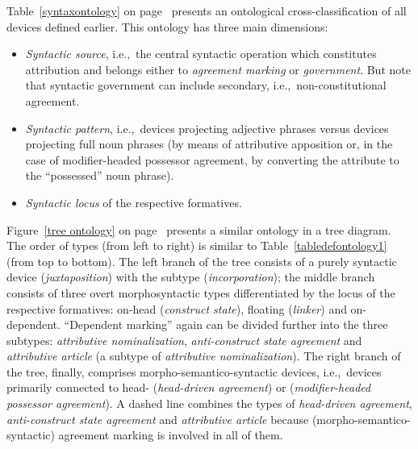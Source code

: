 Table~\ref{syntaxontology} on page~\pageref{syntaxontology} presents an ontological cross-classification of all devices defined earlier. This ontology has three main dimensions: 
\begin{itemize}
\item\textit{Syntactic source}, i.e.,~the central syntactic operation which constitutes attribution and belongs either to \textit{agreement marking} or \textit{government}. But note that syntactic government can include secondary, i.e.,~non-constitutional agreement.
\item\textit{Syntactic pattern}, i.e.,~devices projecting adjective phrases versus devices projecting full noun phrases (by means of attributive apposition or, in the case of modifier\hyp{}headed possessor agreement, by converting the attribute to the “possessed” noun phrase).
\item\textit{Syntactic locus} of the respective formatives.
\end{itemize}
Figure~\ref{tree ontology} on page~\pageref{tree ontology} presents a similar ontology in a tree diagram. The order of types (from left to right) is similar to Table~\ref{tabledefontology1} (from top to bottom). The left branch of the tree consists of a purely syntactic device (\textit{juxtaposition}) with the subtype (\textit{incorporation}); the middle branch consists of three overt morphosyntactic types differentiated by the locus of the respective formatives: on-head (\textit{construct state}), floating (\textit{linker}) and on-dependent. “Dependent marking” again can be divided further into the three subtypes: \textit{attributive nominalization}, \textit{anti\hyp{}construct state agreement} and \textit{attributive article} (a subtype of \textit{attributive nominalization}). The right branch of the tree, finally, comprises morpho-semantico-syntactic devices, i.e.,~devices primarily connected to head- (\textit{head\hyp{}driven agreement}) or  (\textit{modifier\hyp{}headed possessor agreement}). A dashed line combines the types of \textit{head\hyp{}driven agreement}, \textit{anti\hyp{}construct state agreement} and \textit{attributive article} because (morpho-semantico-syntactic) agreement marking is involved in all of them.
